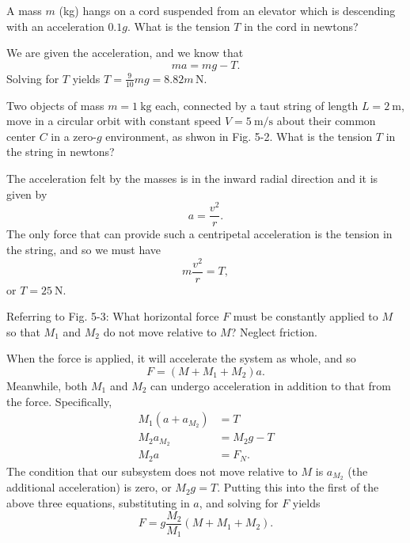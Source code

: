 \documentclass[../feynman-lectures-on-physics.tex]{subfiles}
\begin{document}
\begin{questions}
\begin{solution}
\end{solution}

\question A mass $m$ (kg) hangs on a cord suspended from an elevator which is
descending with an acceleration $0.1g$. What is the tension $T$ in the cord in newtons?

\begin{solution}
  We are given the acceleration, and we know that
  \[
    ma = mg - T.
  \]
  Solving for $T$ yields $T = \frac{9}{10}mg = 8.82m\,\si{\newton}$.
\end{solution}

\question Two objects of mass $m=\SI{1}{\kilo\gram}$ each, connected by a taut
string of length $L=\SI{2}{\meter}$, move in a circular orbit with constant
speed $V=\SI{5}{\meter\per\second}$ about their common center $C$ in a zero-$g$
environment, as shwon in Fig. 5-2. What is the tension $T$ in the string in
newtons?

\begin{solution}
The acceleration felt by the masses is in the inward radial direction and it is
given by
\[
a = \frac{v^2}{r}.
\]
The only force that can provide such a centripetal acceleration is the tension
in the string, and so we must have
\[
m\frac{v^2}{r} = T,
\]
or $T = \SI{25}{\newton}$. 
\end{solution}

\question Referring to Fig. 5-3: What horizontal force $F$ must be constantly
applied to $M$ so that $M_1$ and $M_2$ do not move relative to $M$? Neglect
friction.

\begin{solution}
  When the force is applied, it will accelerate the system as whole, and so
  \[
    F = (M+M_1+M_2)a.
  \]
  Meanwhile, both $M_1$ and $M_2$ can undergo acceleration in addition to that
  from the force. Specifically,
  \begin{align*}
    M_1(a+a_{M_2}) &= T \\
    M_2a_{M_2} &= M_2g - T \\
    M_2a &= F_N.
  \end{align*}
  The condition that our subsystem does not move relative to $M$ is $a_{M_2}$
  (the additional acceleration) is zero, or $M_2g = T$. Putting this into the
  first of the above three equations, substituting in $a$, and solving for $F$
  yields
  \[
    F = g\frac{M_2}{M_1}(M+M_1+M_2).
  \]
\end{solution}


\end{questions}
\end{document}
